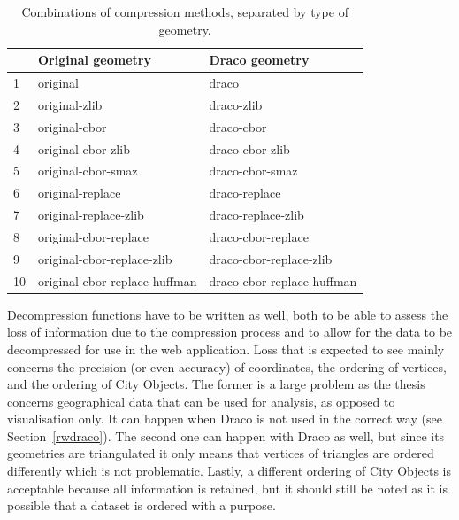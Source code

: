 \begin{table}[]
\begin{tabular}{|l||l|l|}
\hline
 & \textbf{Original geometry}    & \textbf{Draco geometry}    \\
\hline \hline
1 & original                      & draco                      \\
\hline
2 & original-zlib                 & draco-zlib                 \\
\hline
3 &original-cbor                 & draco-cbor                 \\
\hline
4 & original-cbor-zlib            & draco-cbor-zlib            \\
\hline
5 & original-cbor-smaz            & draco-cbor-smaz            \\
\hline
6 & original-replace              & draco-replace              \\
\hline
7 & original-replace-zlib         & draco-replace-zlib         \\
\hline
8 & original-cbor-replace         & draco-cbor-replace         \\
\hline
9 & original-cbor-replace-zlib    & draco-cbor-replace-zlib    \\
\hline
10 & original-cbor-replace-huffman & draco-cbor-replace-huffman \\
\hline
\end{tabular}
\caption{Combinations of compression methods, separated by type of geometry.}
\label{tab:compressionmethods}
\end{table}



Decompression functions have to be written as well, both to be able to assess the loss of information due to the compression process and to allow for the data to be decompressed for use in the web application.
Loss that is expected to see mainly concerns the precision (or even accuracy) of coordinates, the ordering of vertices, and the ordering of City Objects.
The former is a large problem as the thesis concerns geographical data that can be used for analysis, as opposed to visualisation only.
It can happen when Draco is not used in the correct way (see Section~\ref{rwdraco}).
The second one can happen with Draco as well, but since its geometries are triangulated it only means that vertices of triangles are ordered differently which is not problematic.
Lastly, a different ordering of City Objects is acceptable because all information is retained, but it should still be noted as it is possible that a dataset is ordered with a purpose.



